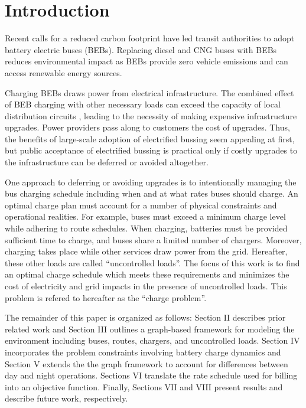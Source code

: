 \section{Introduction}
Recent calls for a reduced carbon footprint have led transit authorities to adopt battery electric buses (BEBs). Replacing diesel and CNG buses with BEBs reduces environmental impact \cite{zhou_optimization_2018} as BEBs provide zero vehicle emissions and can access renewable energy sources\cite{poornesh_comparative_2020}.

\par Charging BEBs draws power from electrical infrastructure. The combined effect of BEB charging with other necessary loads can exceed the capacity of local distribution circuits \cite{stahleder_impact_2019}\cite{deb_impact_2017}\cite{boonraksa_impact_2019}, leading to the necessity of making  expensive infrastructure upgrades. Power providers pass along to customers the cost of upgrades.  Thus, the benefits of large-scale adoption of electrified bussing seem appealing at first, but public acceptance of electrified bussing is practical only if costly upgrades to the infrastructure can be deferred or avoided altogether.

\par One approach to deferring or avoiding upgrades is to intentionally managing the bus charging schedule including when and at what rates buses should charge. An optimal charge plan must account for a number of physical constraints and operational realities. For example, buses must exceed a minimum charge level while adhering to route schedules. When charging, batteries must be provided sufficient time to charge, and buses share a limited number of chargers.  Moreover, charging takes place while other services draw power from the grid.  Hereafter, these other loads are called ``uncontrolled loads''. The focus of this work is to find an optimal charge schedule which meets these requirements and minimizes the cost of electricity and grid impacts in the presence of uncontrolled loads. This problem is refered to hereafter as the ``charge problem''.

\par The remainder of this paper is organized as follows: Section II describes prior related work and Section III outlines a graph-based framework for modeling the environment including buses, routes, chargers, and uncontrolled loads. Section IV incorporates the problem constraints involving battery charge dynamics and Section V extends the the graph framework to account for differences between day and night operations.  Sections VI translate the rate schedule used for billing into an objective function. Finally, Sections VII and VIII present results and describe future work, respectively.
